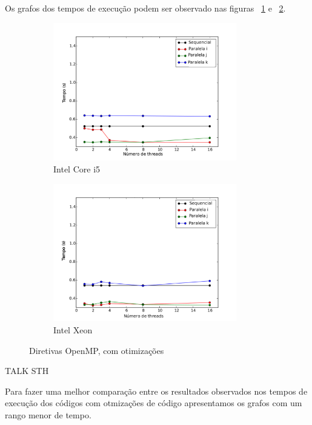 \documentclass[a4paper,12pt,fleqn]{article}
\begin{document}
Os grafos dos tempos de execução podem ser observado nas figuras ~\ref{fig:corei5co} e ~\ref{fig:xeonco}. 

\begin{figure} 
    \centering
    \begin{subfigure}{.5\textwidth}
        \centering
        \includegraphics[height=6cm]{Images/corei5co} 
        \caption{Intel Core i5}
        \label{fig:corei5co} 
    \end{subfigure}%
    \begin{subfigure}{.5\textwidth}
        \centering
        \includegraphics[height=6cm]{Images/xeonco} 
        \caption{Intel Xeon}
        \label{fig:xeonco} 
    \end{subfigure}    
    \caption{Diretivas OpenMP, com otimizações}
    \label{fig:co}
\end{figure} 


TALK STH


Para fazer uma melhor comparação entre os resultados observados nos tempos de execução dos códigos com otmizações de código apresentamos os grafos com um rango menor de tempo.
\end{document}
